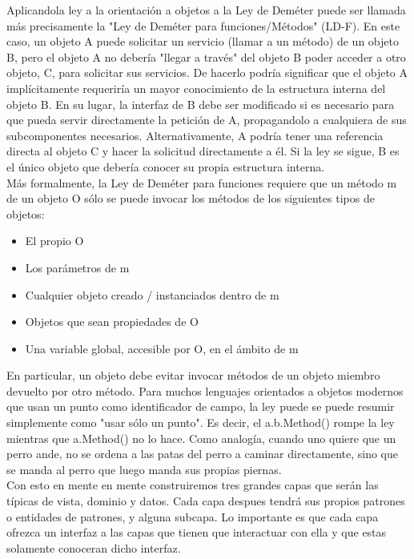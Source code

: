 \documentclass[../pfc.tex]{subfiles}
\begin{document}
	Aplicandola ley a la orientación a objetos a la Ley de Deméter puede ser llamada más precisamente la "Ley de Deméter para funciones/Métodos" (LD-F). En este caso, un objeto A puede solicitar un servicio (llamar a un método) de un objeto B, pero el objeto A no debería "llegar a través" del objeto B poder acceder a otro objeto, C, para solicitar sus servicios. De hacerlo podría significar que el objeto A implícitamente requeriría un mayor conocimiento de la estructura interna del objeto B. En su lugar, la interfaz de B debe ser modificado si es necesario para que pueda servir directamente la petición de A, propagandolo a cualquiera de sus subcomponentes necesarios. Alternativamente, A podría tener una referencia directa al objeto C y hacer la solicitud directamente a él. Si la ley se sigue, B es el único objeto que debería conocer su propia estructura interna.\\
	
	Más formalmente, la Ley de Deméter para funciones requiere que un método m de un objeto O sólo se puede invocar los métodos de los siguientes tipos de objetos:
	\begin{itemize} 
		\item El propio O
		\item Los parámetros de m
		\item Cualquier objeto creado / instanciados dentro de m
		\item Objetos que sean propiedades de O
		\item Una variable global, accesible por O, en el ámbito de m
	\end{itemize}
	
	En particular, un objeto debe evitar invocar métodos de un objeto miembro devuelto por otro método. Para muchos lenguajes orientados a objetos modernos que usan un punto como identificador de campo, la ley puede se puede resumir simplemente como "usar sólo un punto". Es decir, el a.b.Method() rompe la ley mientras que a.Method() no lo hace. Como analogía, cuando uno quiere que un perro ande, no se ordena a las patas del perro a caminar directamente, sino que se manda al perro que luego manda sus propias piernas.\\
		
	Con esto en mente en mente construiremos tres grandes capas que serán las típicas de vista, dominio y datos. Cada capa despues tendrá sus propios patrones o entidades de patrones, y alguna subcapa. Lo importante es que cada capa ofrezca un interfaz a las capas que tienen que interactuar con ella y que estas solamente conoceran dicho interfaz.  \\
	
\end{document}
